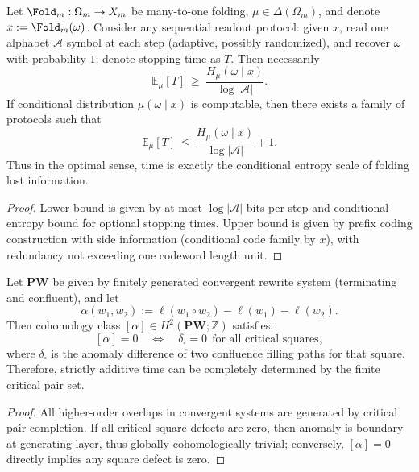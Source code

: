 \begin{theorem}\label{thm:xi-optimal-recovery-time-equals-conditional-entropy}
Let \(\Fold_m:\Omega_m\to X_m\) be many-to-one folding, \(\mu\in\Delta(\Omega_m)\), and denote
\(
x:=\Fold_m(\omega)
\).
Consider any sequential readout protocol: given \(x\), read one alphabet \(\mathcal A\) symbol at each step (adaptive, possibly randomized), and recover \(\omega\) with probability \(1\);
denote stopping time as \(T\).
Then necessarily
\[
\mathbb E_\mu[T]\ \ge\ \frac{H_\mu(\omega\mid x)}{\log|\mathcal A|}.
\]
If conditional distribution \(\mu(\omega\mid x)\) is computable, then there exists a family of protocols such that
\[
\mathbb E_\mu[T]\ \le\ \frac{H_\mu(\omega\mid x)}{\log|\mathcal A|}+1.
\]
Thus in the optimal sense, time is exactly the conditional entropy scale of folding lost information.
\end{theorem}

\begin{proof}
Lower bound is given by at most \(\log|\mathcal A|\) bits per step and conditional entropy bound for optional stopping times.
Upper bound is given by prefix coding construction with side information (conditional code family by \(x\)), with redundancy not exceeding one codeword length unit.
\end{proof}

\begin{theorem}\label{thm:xi-time-additivity-finite-critical-square-criterion}
Let \(\mathbf{PW}\) be given by finitely generated convergent rewrite system (terminating and confluent), and let
\[
\alpha(w_1,w_2):=\ell(w_1\circ w_2)-\ell(w_1)-\ell(w_2).
\]
Then cohomology class \([\alpha]\in H^2(\mathbf{PW};\mathbb Z)\) satisfies:
\[
[\alpha]=0
\quad\Longleftrightarrow\quad
\delta_{\square}=0\ \ \text{for all critical squares},
\]
where \(\delta_{\square}\) is the anomaly difference of two confluence filling paths for that square.
Therefore, strictly additive time can be completely determined by the finite critical pair set.
\end{theorem}

\begin{proof}
All higher-order overlaps in convergent systems are generated by critical pair completion.
If all critical square defects are zero, then anomaly is boundary at generating layer, thus globally cohomologically trivial; conversely, \([\alpha]=0\) directly implies any square defect is zero.
\end{proof}

